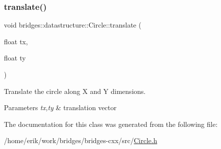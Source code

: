 \subsubsection{\texorpdfstring{translate()}{translate()}}
{\footnotesize\ttfamily void bridges\+::datastructure\+::\+Circle\+::translate (\begin{DoxyParamCaption}\item[{float}]{tx,  }\item[{float}]{ty }\end{DoxyParamCaption})\hspace{0.3cm}{\ttfamily [inline]}}



Translate the circle along X and Y dimensions. 


\begin{DoxyParams}{Parameters}
{\em tx,ty} & translation vector \\
\hline
\end{DoxyParams}


The documentation for this class was generated from the following file\+:\begin{DoxyCompactItemize}
\item 
/home/erik/work/bridges/bridges-\/cxx/src/\hyperlink{_circle_8h}{Circle.\+h}\end{DoxyCompactItemize}
